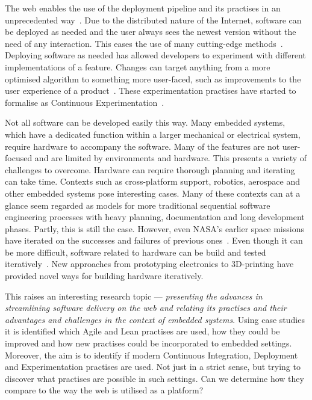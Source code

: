 \documentclass[english]{tktltiki2}
\begin{document}
The web enables the use of the deployment pipeline and its practises in an unprecedented way~\cite{KLS09}. Due to the distributed nature of the Internet, software can be deployed as needed and the user always sees the newest version without the need of any interaction. This eases the use of many cutting-edge methods~\cite{KLS09, FGM14}. Deploying software as needed has allowed developers to experiment with different implementations of a feature. Changes can target anything from a more optimised algorithm to something more user-faced, such as improvements to the user experience of a product~\cite{KLS09}. These experimentation practises have started to formalise as Continuous Experimentation~\cite{FGM14}.

Not all software can be developed easily this way. Many embedded systems, which have a dedicated function within a larger mechanical or electrical system, require hardware to accompany the software. Many of the features are not user-focused and are limited by environments and hardware. This presents a variety of challenges to overcome. Hardware can require thorough planning and iterating can take time. Contexts such as cross-platform support, robotics, aerospace and other embedded systems pose interesting cases. Many of these contexts can at a glance seem regarded as models for more traditional sequential software engineering processes with heavy planning, documentation and long development phases. Partly, this is still the case. However, even NASA’s earlier space missions have iterated on the successes and failures of previous ones~\cite{LB03}. Even though it can be more difficult, software related to hardware can be build and tested iteratively~\cite{LB03}. New approaches from prototyping electronics to 3D-printing have provided novel ways for building hardware iteratively.

This raises an interesting research topic — \emph{presenting the advances in streamlining software delivery on the web and relating its practises and their advantages and challenges in the context of embedded systems}. Using case studies it is identified which Agile and Lean practises are used, how they could be improved and how new practises could be incorporated to embedded settings. Moreover, the aim is to identify if modern Continuous Integration, Deployment and Experimentation practises are used. Not just in a strict sense, but trying to discover what practises are possible in such settings. Can we determine how they compare to the way the web is utilised as a platform?
\end{document}

